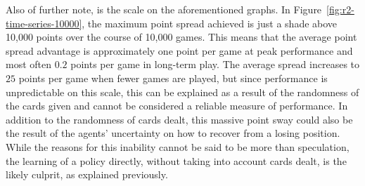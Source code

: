 Also of further note, is the scale on the aforementioned graphs.
%
In Figure~\ref{fig:r2-time-series-10000},
the maximum point spread achieved is just a shade above 10,000 points
over the course of 10,000 games.
%
This means that the average point spread advantage is approximately 
one point per game at peak performance\textemdash
and most often $0.2$ points per game\textemdash
in long-term play.
%
The average spread increases to $25$ points per game when fewer games are 
played,
but since performance is unpredictable on this scale,
this can be explained as a result of the randomness of the cards given
and cannot be considered a reliable measure of performance.
%
In addition to the randomness of cards dealt,
this massive point sway could also be the result of the agents' uncertainty on 
how to recover from a losing position.
%
While the reasons for this inability cannot be said to be more than speculation,
the learning of a policy directly, without taking into account cards dealt,
is the likely culprit,
as explained previously.

